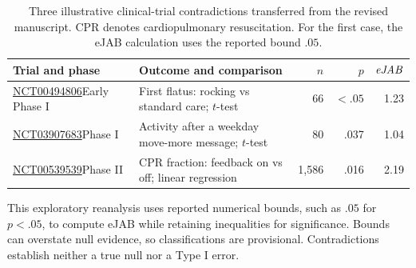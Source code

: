\documentclass[11pt,letterpaper]{article}
\begin{document}
\begin{table}[htbp]
\centering
\setlength{\tabcolsep}{4pt}
\begin{tabular}{@{}p{1.18in}p{2.35in}rrr@{}}
\toprule
Trial and phase & Outcome and comparison & \(n\) & \(p\) & \(\mathit{eJAB}\)\\
\midrule
\href{https://clinicaltrials.gov/study/NCT00494806?tab=results}{NCT00494806}\newline Early Phase I & First flatus: rocking vs standard care; \(t\)-test & 66 & \(<.05\) & 1.23\\[6pt]
\href{https://clinicaltrials.gov/study/NCT03907683?tab=results}{NCT03907683}\newline Phase I & Activity after a weekday move-more message; \(t\)-test & 80 & .037 & 1.04\\[6pt]
\href{https://clinicaltrials.gov/study/NCT00539539?tab=results}{NCT00539539}\newline Phase II & CPR fraction: feedback on vs off; linear regression & 1,586 & .016 & 2.19\\
\bottomrule
\end{tabular}
\caption{Three illustrative clinical-trial contradictions transferred
from the revised manuscript. CPR denotes cardiopulmonary resuscitation.
For the first case, the eJAB calculation uses the reported bound \(.05\).}
\label{tab:clinical-contradictions}
\end{table}

This exploratory reanalysis uses reported numerical bounds, such as
\(.05\) for \(p<.05\), to compute eJAB while retaining inequalities
for significance. Bounds can overstate null evidence, so classifications
are provisional. Contradictions establish neither a true null nor a
Type I error.
\end{document}
